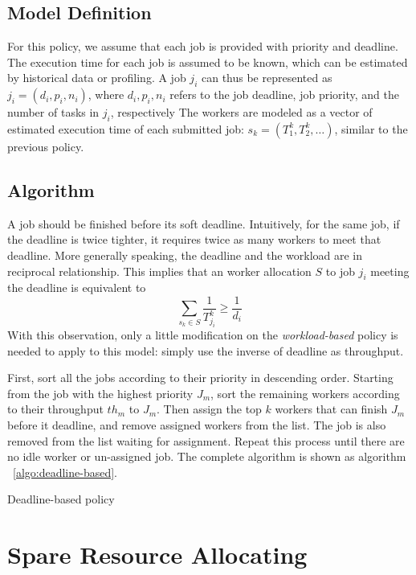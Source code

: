 \subsection{Model Definition}

For this policy, we assume that each job is provided with priority and
deadline.
The execution time for each job is assumed to be known, which can be 
estimated by historical data or profiling.
A job $j_i$ can thus be represented as $j_i = (d_i, p_i, n_i)$, where
$d_i, p_i, n_i$ refers to the job deadline, job priority, and the 
number of tasks in $j_i$, respectively
The workers are modeled as a vector of estimated execution time of each 
submitted job: $s_k = (T^k_1, T^k_2, \ldots)$, similar to the previous 
policy.

\subsection{Algorithm}

A job should be finished before its soft deadline.
Intuitively, for the same job, if the deadline is twice tighter, it
requires twice as many workers to meet that deadline.
More generally speaking, the deadline and the workload are in reciprocal
relationship.
This implies that an worker allocation $S$ to job $j_i$ meeting the
deadline is equivalent to
\[\displaystyle\sum_{s_k \in S}\frac{1}{T^k_{j_i}} \geq \frac{1}{d_i}\]
With this observation, only a little modification on the
\emph{workload-based} policy is needed to apply to this model: simply
use the inverse of deadline as throughput.

First, sort all the jobs according to their priority in descending
order.
Starting from the job with the highest priority $J_m$, sort the
remaining workers according to their throughput $th_m$ to $J_m$.
Then assign the top $k$ workers that can finish $J_m$ before it 
deadline, and remove assigned workers from the list.
The job is also removed from the list waiting for assignment.
Repeat this process until there are no idle worker or un-assigned job.
The complete algorithm is shown as algorithm ~\ref{algo:deadline-based}.

\begin{algorithm}[htbp]
  
  \caption{Deadline-based policy}
  \label{algo:deadline-based}
\end{algorithm}

\section{Spare Resource Allocating}

